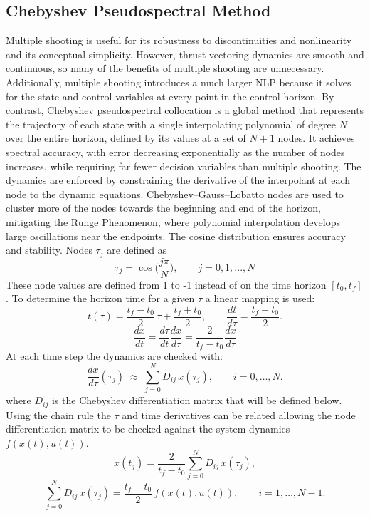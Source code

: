 \documentclass[]{article}
\begin{document}
\subsection*{Chebyshev Pseudospectral Method}
Multiple shooting is useful for its robustness to discontinuities and nonlinearity and its conceptual simplicity. However, thrust-vectoring dynamics are smooth and continuous, so many of the benefits of multiple shooting are unnecessary. Additionally, multiple shooting introduces a much larger NLP because it solves for the state and control variables at every point in the control horizon. By contrast, Chebyshev pseudospectral collocation is a global method that represents the trajectory of each state with a single interpolating polynomial of degree $N$ over the entire horizon, defined by its values at a set of $N+1$ nodes. It achieves spectral accuracy, with error decreasing exponentially as the number of nodes increases, while requiring far fewer decision variables than multiple shooting. The dynamics are enforced by constraining the derivative of the interpolant at each node to the dynamic equations. Chebyshev–Gauss–Lobatto nodes are used to cluster more of the nodes towards the beginning and end of the horizon, mitigating the Runge Phenomenon, where polynomial interpolation develops large oscillations near the endpoints. The cosine distribution ensures accuracy and stability. Nodes $\tau_j$ are defined as
	\[
        \tau_j = \cos{\Big(\frac{j\pi}{N}\Big)},\qquad j = 0,1,...,N
        \]
 These node values are defined from 1 to -1 instead of on the time horizon $[t_0 , t_f]$. To determine the horizon time for a given $\tau$ a linear mapping is used:
         \[
        t(\tau) = \frac{t_f-t_0}{2}\,\tau + \frac{t_f+t_0}{2}, 
        \qquad 
        \frac{dt}{d\tau} = \frac{t_f-t_0}{2}.
        \]
        \[
        \frac{dx}{dt}=\frac{d\tau}{dt}\frac{dx}{d\tau}=\frac{2}{t_f-t_0}\frac{dx}{d\tau}
        \]
At each time step the dynamics are checked with:
        \[
        \frac{dx}{d\tau}(\tau_j) \;\approx\; \sum_{j=0}^N D_{ij}\,x(\tau_j), 
        \qquad i=0,\dots,N.
        \]
where $D_{ij}$ is the Chebyshev differentiation matrix that will be defined below. Using the chain rule the $\tau$ and time derivatives can be related allowing the node differentiation matrix to be checked against the system dynamics $f(x(t), u(t))$.
        \[
       \dot{x}(t_j)= \frac{2}{t_f-t_0}\sum_{j=0}^N D_{ij}\,x(\tau_j), 
        \]
        \[
        \sum_{j=0}^N D_{ij}\,x(\tau_j)
        = \frac{t_f-t_0}{2}\, f(x(t),u(t)), 
        \qquad i=1,\dots,N-1.
        \]
\end{document}
